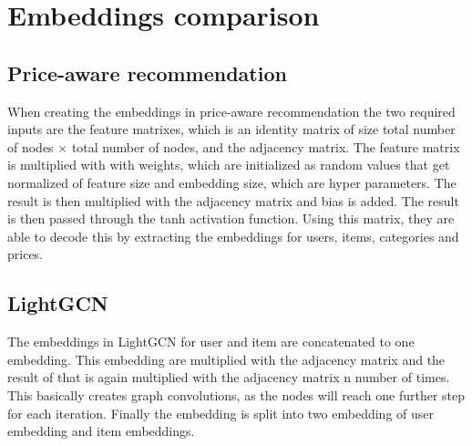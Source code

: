 \section{Embeddings comparison}
\subsection{Price-aware recommendation}
When creating the embeddings in price-aware recommendation the two required inputs are the feature matrixes, which is an identity matrix of size total number of nodes $\times$ total number of nodes, and the adjacency matrix.
The feature matrix is multiplied with with weights, which are initialized as random values that get normalized of feature size and embedding size, which are hyper parameters.
The result is then multiplied with the adjacency matrix and bias is added.
The result is then passed through the tanh activation function.
Using this matrix, they are able to decode this by extracting the embeddings for users, items, categories and prices.

\subsection{LightGCN}
The embeddings in LightGCN for user and item are concatenated to one embedding.
This embedding are multiplied with the adjacency matrix and the result of that is again multiplied with the adjacency matrix n number of times.
This basically creates graph convolutions, as the nodes will reach one further step for each iteration.
Finally the embedding is split into two embedding of user embedding and item embeddings.
